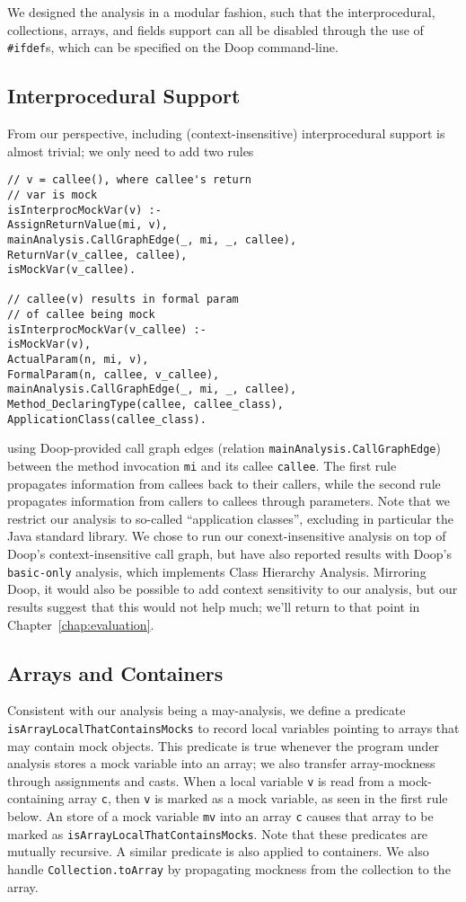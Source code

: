 We designed the analysis in a modular fashion, such that the interprocedural, collections, arrays, and fields support can all be disabled through the use of \verb+#ifdef+s, which can be specified on the Doop command-line.

\subsection{Interprocedural Support} 

From our perspective, including (context-insensitive) interprocedural support is almost trivial; we only need to add two rules
\begin{lstlisting}[basicstyle=\ttfamily\small,numbers=none]
// v = callee(), where callee's return 
// var is mock
isInterprocMockVar(v) :-
AssignReturnValue(mi, v),
mainAnalysis.CallGraphEdge(_, mi, _, callee),
ReturnVar(v_callee, callee),
isMockVar(v_callee).

// callee(v) results in formal param 
// of callee being mock
isInterprocMockVar(v_callee) :-
isMockVar(v),
ActualParam(n, mi, v),
FormalParam(n, callee, v_callee),
mainAnalysis.CallGraphEdge(_, mi, _, callee),
Method_DeclaringType(callee, callee_class),
ApplicationClass(callee_class).
\end{lstlisting}
using Doop-provided call graph edges (relation \texttt{mainAnalysis.CallGraphEdge}) between the method invocation {\tt mi} and its callee {\tt callee}. The first rule propagates information from callees back to their callers, while the second rule propagates information from callers to callees through parameters. Note that we restrict our analysis to so-called ``application classes'', excluding in particular the Java standard library. We chose to run our conext-insensitive analysis on top of Doop's context-insensitive call graph, but have also reported results with Doop's \texttt{basic-only} analysis, which implements Class Hierarchy Analysis. Mirroring Doop, it would also be possible to add context sensitivity to our analysis, but our results suggest that this would not help much; we'll return to that point in Chapter~\ref{chap:evaluation}.

\subsection{Arrays and Containers} 

Consistent with our analysis being a may-analysis, we define a predicate \\ {\tt isArrayLocalThatContainsMocks} to record local variables pointing to arrays that may contain mock objects. This predicate is true whenever the program under analysis stores a mock variable into an array; we also transfer array-mockness through assignments and casts. When a local variable \texttt{v} is read from a mock-containing array \texttt{c}, then \texttt{v} is marked as a mock variable, as seen in the first rule below. An store of a mock variable \texttt{mv} into an array \texttt{c} causes that array to be marked as \texttt{isArrayLocalThatContainsMocks}. Note that these predicates are mutually recursive. A similar predicate is also applied to containers. We also handle {\tt Collection.toArray} by propagating mockness from the collection to the array.

